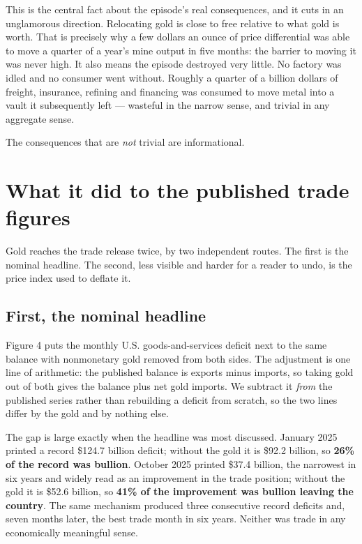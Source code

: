 \documentclass[11pt]{article}
\begin{document}
This is the central fact about the episode's real consequences, and it cuts in
an unglamorous direction. Relocating gold is close to free relative to what gold
is worth. That is precisely why a few dollars an ounce of price differential was
able to move a quarter of a year's mine output in five months: the barrier to
moving it was never high. It also means the episode destroyed very little. No
factory was idled and no consumer went without. Roughly a quarter of a billion
dollars of freight, insurance, refining and financing was consumed to move metal
into a vault it subsequently left --- wasteful in the narrow sense, and trivial
in any aggregate sense.

The consequences that are \emph{not} trivial are informational.

\section{What it did to the published trade figures}

Gold reaches the trade release twice, by two independent routes. The first is
the nominal headline. The second, less visible and harder for a reader to undo,
is the price index used to deflate it.

\subsection*{First, the nominal headline}

Figure 4 puts the monthly U.S. goods-and-services deficit next to the same
balance with nonmonetary gold removed from both sides. The adjustment is one
line of arithmetic: the published balance is exports minus imports, so taking
gold out of both gives the balance plus net gold imports. We subtract it
\emph{from} the published series rather than rebuilding a deficit from scratch,
so the two lines differ by the gold and by nothing else.

The gap is large exactly when the headline was most discussed. January 2025
printed a record \$124.7 billion deficit; without the gold it is \$92.2 billion,
so \textbf{26\% of the record was bullion}. October 2025 printed \$37.4 billion,
the narrowest in six years and widely read as an improvement in the trade
position; without the gold it is \$52.6 billion, so \textbf{41\% of the
improvement was bullion leaving the country}. The same mechanism produced three
consecutive record deficits and, seven months later, the best trade month in six
years. Neither was trade in any economically meaningful sense.
\end{document}
